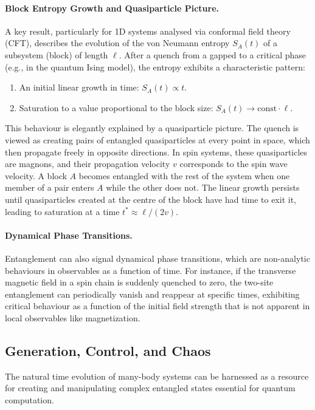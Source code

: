 \paragraph{Block Entropy Growth and Quasiparticle Picture.}
A key result, particularly for 1D systems analysed via conformal field theory
(CFT), describes the evolution of the von Neumann entropy $S_A(t)$ of a
subsystem (block) of length $\ell$. After a quench from a gapped to a
critical phase (e.g., in the quantum Ising model), the entropy exhibits a
characteristic pattern:
\begin{enumerate}
	\item An initial linear growth in time: $S_A(t) \propto t$.
	\item Saturation to a value proportional to the block size: $S_A(t) \to \text{const} \cdot \ell$.
\end{enumerate}
This behaviour is elegantly explained by a quasiparticle picture. The quench
is viewed as creating pairs of entangled quasiparticles at every point in
space, which then propagate freely in opposite directions. In spin systems, these
quasiparticles are magnons, and their propagation velocity $v$ corresponds to
the spin wave velocity. A block $A$ becomes entangled with the rest
of the system when one member of a pair enters $A$ while the other does not.
The linear growth persists until quasiparticles created at the centre of the
block have had time to exit it, leading to saturation at a time $t^* \approx \ell/(2v)$.

\paragraph{Dynamical Phase Transitions.}
Entanglement can also signal dynamical phase transitions, which are
non-analytic behaviours in observables as a function of time. For instance,
if the transverse magnetic field in a spin chain is suddenly quenched to zero,
the two-site entanglement can periodically vanish and reappear at specific
times, exhibiting critical behaviour as a function of the initial field
strength that is not apparent in local observables like magnetization.

\subsection{Generation, Control, and Chaos}
\label{sub:generation_control}

The natural time evolution of many-body systems can be harnessed as a
resource for creating and manipulating complex entangled states essential for
quantum computation.

